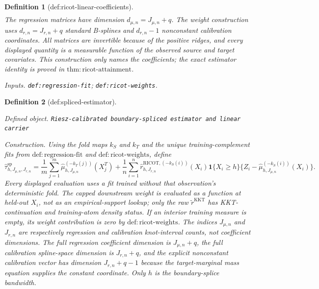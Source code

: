 \documentclass{article}
\newtheorem{definition}{Definition}
\begin{document}
\begin{definition}[def:ricot-linear-coefficients]
\[\begin{aligned}
\end{aligned}
\]
The regression matrices have dimension \(d_{\mu,n}=J_{\mu,n}+q\). The weight construction uses \(d_{r,n}=J_{r,n}+q\) standard B-splines and \(d_{r,n}-1\) nonconstant calibration coordinates. All matrices are invertible because of the positive ridges, and every displayed quantity is a measurable function of the observed source and target covariates. This construction only names the coefficients; the exact estimator identity is proved in \(\mathrm{thm:ricot\text{-}attainment}\).
\par\smallskip\noindent\emph{Inputs.} \texttt{def:\allowbreak{}regression-\allowbreak{}fit}; \texttt{def:\allowbreak{}ricot-\allowbreak{}weights}.
\end{definition}

\begin{definition}[def:spliced-estimator]\label{def:spliced-estimator}
\par\smallskip\noindent\emph{Defined object.} \texttt{Riesz-\allowbreak{}calibrated boundary-\allowbreak{}spliced estimator and linear carrier}
\par\smallskip\noindent\emph{Construction.} Using the fold maps \(k_S\) and \(k_T\) and the unique training-complement fits from \(\mathrm{def:regression\text{-}fit}\) and \(\mathrm{def:ricot\text{-}weights}\), define
\[
\widehat\tau^{\mathrm{sp}}_{h,J_{\mu,n},J_{r,n}}=
\frac1m\sum_{j=1}^m\widehat\mu_{h,J_{\mu,n}}^{(-k_T(j))}(X_j^T)
+\frac1n\sum_{i=1}^n\widehat r^{\mathrm{RICOT},(-k_S(i))}_{h,J_{r,n}}(X_i)\mathbf 1\{X_i\ge h\}\{Z_i-\widehat\mu_{h,J_{\mu,n}}^{(-k_S(i))}(X_i)\}.
\]
Every displayed evaluation uses a fit trained without that observation's deterministic fold. The capped downstream weight is evaluated as a function at held-out \(X_i\), not as an empirical-support lookup; only the raw \(\widetilde r^{\mathrm{KKT}}\) has KKT-continuation and training-atom density status. If an interior training measure is empty, its weight contribution is zero by \(\mathrm{def:ricot\text{-}weights}\). The indices \(J_{\mu,n}\) and \(J_{r,n}\) are respectively regression and calibration knot-interval counts, not coefficient dimensions. The full regression coefficient dimension is \(J_{\mu,n}+q\), the full calibration spline-space dimension is \(J_{r,n}+q\), and the explicit nonconstant calibration vector has dimension \(J_{r,n}+q-1\) because the target-marginal mass equation supplies the constant coordinate. Only \(h\) is the boundary-splice bandwidth.


\end{definition}
\end{document}
